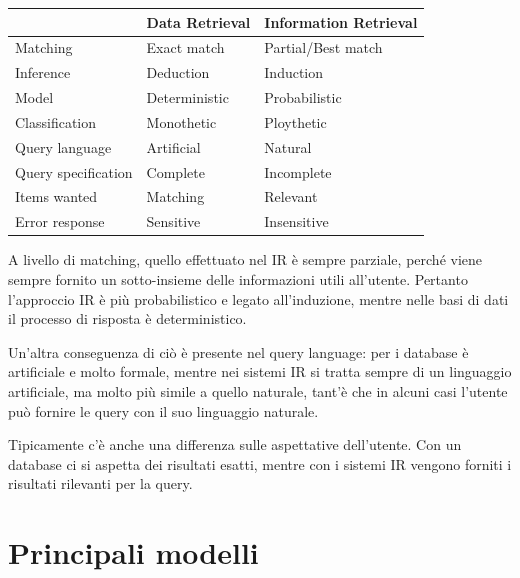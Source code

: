 \begin{table}[htbp]
	\centering
	\begin{tabular}{l|l|l|}
		\cline{2-3}
		& Data Retrieval & Information Retrieval            \\ \hline
		\multicolumn{1}{|l|}{Matching}            & Exact match    & Partial/Best match\\ \hline
		\multicolumn{1}{|l|}{Inference}           & Deduction      & Induction                        \\ \hline
		\multicolumn{1}{|l|}{Model}               & Deterministic  & Probabilistic                    \\ \hline
		\multicolumn{1}{|l|}{Classification}      & Monothetic     & Ploythetic                       \\ \hline
		\multicolumn{1}{|l|}{Query language}      & Artificial     & Natural                          \\ \hline
		\multicolumn{1}{|l|}{Query specification} & Complete       & Incomplete                       \\ \hline
		\multicolumn{1}{|l|}{Items wanted}        & Matching       & Relevant                         \\ \hline
		\multicolumn{1}{|l|}{Error response}      & Sensitive      & Insensitive                      \\ \hline
	\end{tabular}
\end{table}

A livello di matching, quello effettuato nel IR è sempre parziale, perché viene sempre fornito un sotto-insieme delle informazioni utili all'utente.
Pertanto l'approccio IR è più probabilistico e legato all'induzione, mentre nelle basi di dati il processo di risposta è deterministico.

Un'altra conseguenza di ciò è presente nel query language: per i database è artificiale e molto formale, mentre nei sistemi IR si tratta sempre di un linguaggio artificiale, ma molto più simile a quello naturale, tant'è che in alcuni casi l'utente può fornire le query con il suo linguaggio naturale.

Tipicamente c'è anche una differenza sulle aspettative dell'utente.
Con un database ci si aspetta dei risultati esatti, mentre con i sistemi IR vengono forniti i risultati rilevanti per la query.

\section{Principali modelli}

